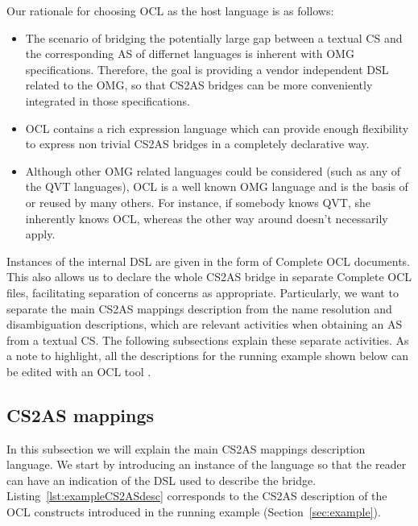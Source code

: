 \documentclass{llncs}
\begin{document}
Our rationale for choosing OCL as the host language is as follows:
\begin{itemize}
\item The scenario of bridging the potentially large gap between a textual CS and the corresponding AS of differnet languages is inherent with OMG specifications. Therefore, the goal is providing a vendor independent DSL related to the OMG, so that CS2AS bridges can be more conveniently integrated in those specifications. 
\item OCL contains a rich expression language which can provide enough flexibility to express non trivial CS2AS bridges in a completely declarative way.
\item Although other OMG related languages could be considered (such as any of the QVT languages), OCL is a well known OMG language and is the basis of or reused by many others. For instance, if somebody knows QVT, she inherently knows OCL, whereas the other way around doesn't necessarily apply.
\end{itemize}

Instances of the internal DSL are given in the form of Complete OCL documents. This also allows us to declare the whole CS2AS bridge in separate Complete OCL files, facilitating separation of concerns as appropriate. Particularly, we want to separate the main CS2AS mappings description from the name resolution and disambiguation descriptions, which are relevant activities when obtaining an AS from a textual CS. The following subsections explain these separate activities. As a note to highlight, all the descriptions for the running example shown below can be edited with an OCL tool \cite{eclipseOclOnline}.

\subsection{CS2AS mappings}
\label{subsec:mappings}

In this subsection we will explain the main CS2AS mappings description language. We start by introducing an instance of the language so that the reader can have an indication of the DSL used to describe the bridge. Listing~\ref{lst:exampleCS2ASdesc} corresponds to the CS2AS description of the OCL constructs introduced in the running example (Section~\ref{sec:example}).
\end{document}
